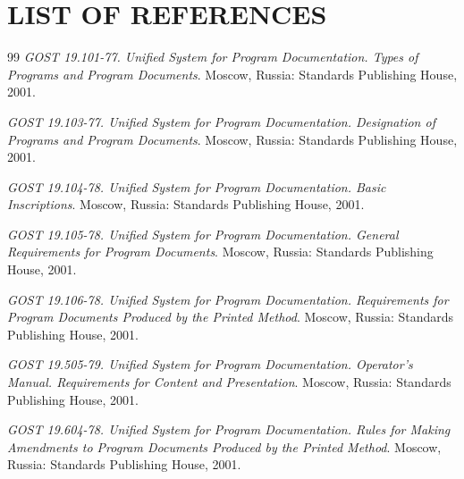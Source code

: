\documentclass[12pt,a4paper]{extarticle}
\begin{document}
\clearpage

\pagestyle{appendix}

\section*{LIST OF REFERENCES}

\renewcommand{\refname}{}
\begin{thebibliography}{99}
\emph{GOST 19.101-77. Unified System for Program Documentation. Types of Programs and Program Documents}. Moscow, Russia: Standards Publishing House, 2001.

\emph{GOST 19.103-77. Unified System for Program Documentation. Designation of Programs and Program Documents}. Moscow, Russia: Standards Publishing House, 2001.

\emph{GOST 19.104-78. Unified System for Program Documentation. Basic Inscriptions}. Moscow, Russia: Standards Publishing House, 2001.

\emph{GOST 19.105-78. Unified System for Program Documentation. General Requirements for Program Documents}. Moscow, Russia: Standards Publishing House, 2001.

\emph{GOST 19.106-78. Unified System for Program Documentation. Requirements for Program Documents Produced by the Printed Method}. Moscow, Russia: Standards Publishing House, 2001.

\emph{GOST 19.505-79. Unified System for Program Documentation. Operator's Manual. Requirements for Content and Presentation}. Moscow, Russia: Standards Publishing House, 2001.

\emph{GOST 19.604-78. Unified System for Program Documentation. Rules for Making Amendments to Program Documents Produced by the Printed Method}. Moscow, Russia: Standards Publishing House, 2001.
\end{thebibliography}

\clearpage



\end{document}
